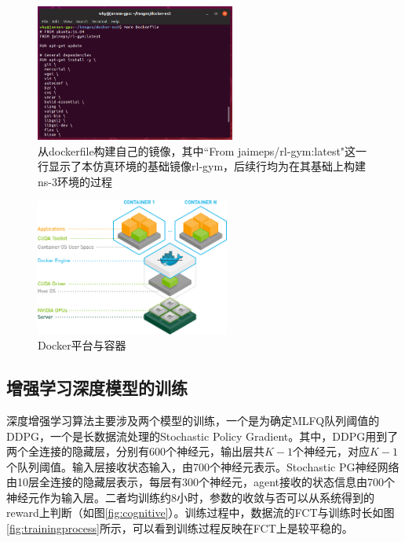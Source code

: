 \begin{figure}[ht]
\centering
\includegraphics[height=4.5cm]{figure/merge.png}
\caption{从dockerfile构建自己的镜像，其中``From jaimeps/rl-gym:latest"这一行显示了本仿真环境的基础镜像rl-gym，后续行均为在其基础上构建ns-3环境的过程}
\label{fig:merge}
\end{figure}

\begin{figure}[ht]
\centering
\includegraphics[height=4.5cm]{figure/docker.png}
\caption{Docker平台与容器}
\label{fig:docker}
\end{figure}



\subsection{增强学习深度模型的训练}

深度增强学习算法主要涉及两个模型的训练，一个是为确定MLFQ队列阈值的DDPG，一个是长数据流处理的Stochastic Policy Gradient。其中，DDPG用到了两个全连接的隐藏层，分别有600个神经元，输出层共$K-1$个神经元，对应$K-1$个队列阈值。输入层接收状态输入，由700个神经元表示。Stochastic PG神经网络由10层全连接的隐藏层表示，每层有300个神经元，agent接收的状态信息由700个神经元作为输入层。二者均训练约8小时，参数的收敛与否可以从系统得到的reward上判断（如图\ref{fig:cognitive}）。训练过程中，数据流的FCT与训练时长如图\ref{fig:trainingprocess}所示，可以看到训练过程反映在FCT上是较平稳的。


